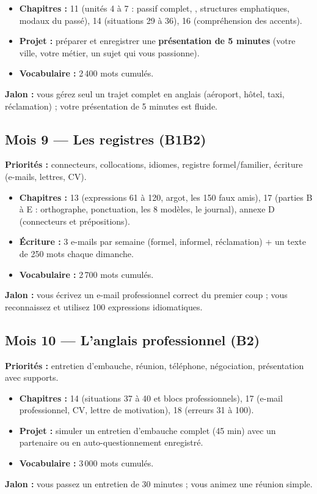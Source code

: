 \begin{itemize}
  \item \textbf{Chapitres :} 11 (unités 4 à 7 : passif complet, , structures emphatiques, modaux du passé), 14 (situations 29 à 36), 16 (compréhension des accents).
  \item \textbf{Projet :} préparer et enregistrer une \textbf{présentation de 5 minutes}
  (votre ville, votre métier, un sujet qui vous passionne).
  \item \textbf{Vocabulaire :} 2\,400 mots cumulés.
\end{itemize}
\textbf{Jalon :} vous gérez seul un trajet complet en anglais (aéroport, hôtel, taxi,
réclamation) ; votre présentation de 5 minutes est fluide.

\subsection{Mois 9 --- Les registres (B1\ra B2)}
\textbf{Priorités :} connecteurs, collocations, idiomes, registre formel/familier,
écriture (e-mails, lettres, CV).

\begin{itemize}
  \item \textbf{Chapitres :} 13 (expressions 61 à 120, argot, les 150 faux amis), 17 (parties B à E : orthographe, ponctuation, les 8 modèles, le journal), annexe D (connecteurs et prépositions).
  \item \textbf{Écriture :} 3 e-mails par semaine (formel, informel, réclamation) + un
  texte de 250 mots chaque dimanche.
  \item \textbf{Vocabulaire :} 2\,700 mots cumulés.
\end{itemize}
\textbf{Jalon :} vous écrivez un e-mail professionnel correct du premier coup ; vous
reconnaissez et utilisez 100 expressions idiomatiques.

\subsection{Mois 10 --- L'anglais professionnel (B2)}
\textbf{Priorités :} entretien d'embauche, réunion, téléphone, négociation, présentation
avec supports.

\begin{itemize}
  \item \textbf{Chapitres :} 14 (situations 37 à 40 et blocs professionnels), 17 (e-mail professionnel, CV, lettre de motivation), 18 (erreurs 31 à 100).
  \item \textbf{Projet :} simuler un entretien d'embauche complet (45 min) avec un
  partenaire ou en auto-questionnement enregistré.
  \item \textbf{Vocabulaire :} 3\,000 mots cumulés.
\end{itemize}
\textbf{Jalon :} vous passez un entretien de 30 minutes ; vous animez une réunion simple.

